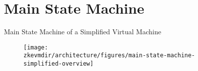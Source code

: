 
\section{Main State Machine}



\begin{frame}{Main State Machine of a Simplified Virtual Machine}
\begin{figure}
	\texttt{[image: \\zkevmdir/architecture/figures/main-state-machine-simplified-overview]}
\end{figure}
\end{frame}
















